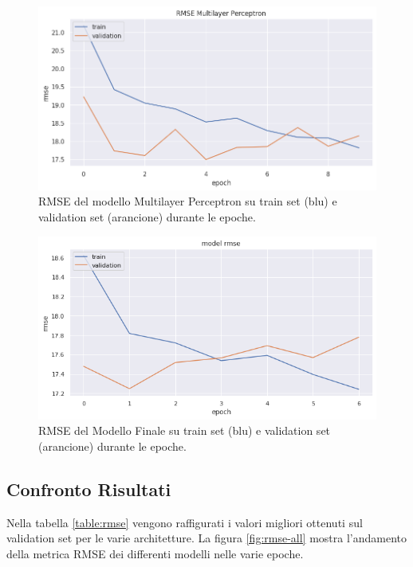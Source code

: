     \begin{figure}[h]
        \centering
        \vspace*{-2.5cm}
        \includegraphics[scale=0.55]{Plot/MLP_RMSE.png}
        \caption{RMSE del modello Multilayer Perceptron su train set (blu) e validation set (arancione) durante le epoche.}
        \label{fig:rmse-mlp}
    \end{figure}
    

    \begin{figure}[h]
        \centering
        \includegraphics[scale=0.55]{Plot/FINAL_RMSE.png}
        \caption{RMSE del Modello Finale su train set (blu) e validation set (arancione) durante le epoche.}
        \label{fig:rmse-final}
    \end{figure}
    
\newpage


\subsection{Confronto Risultati}


Nella tabella \ref{table:rmse} vengono raffigurati i valori migliori ottenuti sul validation set per le varie architetture. La figura \ref{fig:rmse-all} mostra l'andamento della metrica RMSE dei differenti modelli nelle varie epoche.

